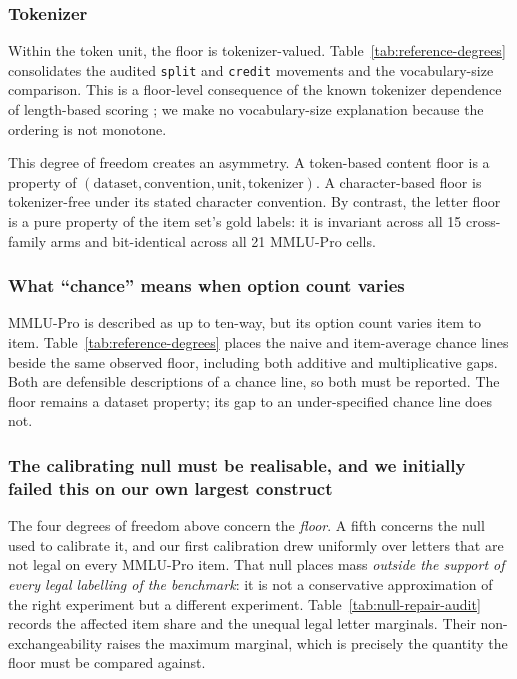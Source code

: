 \subsubsection{Tokenizer}

Within the token unit, the floor is tokenizer-valued. Table~\ref{tab:reference-degrees} consolidates the audited \texttt{split} and \texttt{credit} movements and the vocabulary-size comparison. This is a floor-level consequence of the known tokenizer dependence of length-based scoring \citep{oostermeijer2026length}; we make no vocabulary-size explanation because the ordering is not monotone.

This degree of freedom creates an asymmetry. A token-based content floor is a property of $(\text{dataset},\text{convention},\text{unit},\text{tokenizer})$. A character-based floor is tokenizer-free under its stated character convention. By contrast, the letter floor is a pure property of the item set's gold labels: it is invariant across all 15 cross-family arms and bit-identical across all 21 MMLU-Pro cells.

\subsubsection{What ``chance'' means when option count varies}

MMLU-Pro is described as up to ten-way, but its option count varies item to item. Table~\ref{tab:reference-degrees} places the naive and item-average chance lines beside the same observed floor, including both additive and multiplicative gaps. Both are defensible descriptions of a chance line, so both must be reported. The floor remains a dataset property; its gap to an under-specified chance line does not.



\subsubsection{The calibrating null must be realisable, and we initially failed this on our own largest construct}
\label{sec:legality-aware-null}

The four degrees of freedom above concern the \emph{floor}. A fifth concerns the null used to calibrate it, and our first calibration drew uniformly over letters that are not legal on every MMLU-Pro item. That null places mass \emph{outside the support of every legal labelling of the benchmark}: it is not a conservative approximation of the right experiment but a different experiment. Table~\ref{tab:null-repair-audit} records the affected item share and the unequal legal letter marginals. Their non-exchangeability raises the maximum marginal, which is precisely the quantity the floor must be compared against.

